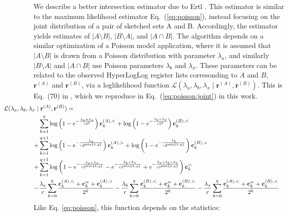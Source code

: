 \documentclass{report}
\begin{document}
We describe a better intersection estimator due to Ertl \cite{ertl2017new}.
This estimator is similar to the maximum likelihood estimator Eq.~(\ref{eq:poisson}), instead focusing on the joint distribution of a pair of sketched sets A and B.
Accordingly, the estimator yields estimates of $|A \setminus B|$, $|B \setminus A|$, and $|A \cap B|$. 
The algorithm depends on a similar optimization of a Poisson model application, where it is assumed that $|A \setminus B|$ is drawn from a Poisson distribution with parameter $\lambda_a$, and similarly $|B \setminus A|$ and $|A \cap B|$ use Poisson parameters $\lambda_b$ and $\lambda_x$. These parameters can be related to the observed HyperLogLog register lists corresonding to $A$ and $B$, $\mathbf{r}^{(A)}$ and $\mathbf{r}^{(B)}$, via a loglikelihood function $\mathcal{L}(\lambda_a, \lambda_b, \lambda_x \mid \mathbf{r}^{(A)}, \mathbf{r}^{(B)})$. 
This is Eq.~(70) in \cite{ertl2017new}, which we reproduce in Eq.~(\ref{eq:poisson:joint}) in this work. 
%
\begin{equation} \label{eq:poisson:joint}
	\begin{aligned}
		\mathclap{\mathcal{L}(\lambda_a, \lambda_b, \lambda_x \mid \mathbf{r}^{(A)}, \mathbf{r}^{(B)}) =} \\
		&\sum_{k=1}^q \log \left ( 1 - e^{-\frac{\lambda_a + \lambda_x}{r2^k}} \right ) \mathbf{c}^{(A), <}_k 
		+ \log \left ( 1 - e^{-\frac{\lambda_b + \lambda_x}{r2^k}} \right ) \mathbf{c}^{(B), <}_k\\
		+ &\sum_{k=1}^{q+1} \log \left ( 1 - e^{-\frac{\lambda_a}{r2^{\min\{k,q\}}}} \right ) \mathbf{c}^{(A), >}_k
		+ \log \left ( 1 - e^{-\frac{\lambda_b}{r2^{\min\{k,q\}}}} \right ) \mathbf{c}^{(B), >}_k \\
		+ &\sum_{k=1}^{q+1} \log \left ( 1 - e^{-\frac{\lambda_a + \lambda_x}{r2^{\min\{k,q\}}}} 
				- e^{-\frac{\lambda_b + \lambda_x}{r2^{\min\{k,q\}}}} + e^{-\frac{\lambda_a + \lambda_b + \lambda_x}{r2^{\min\{k,q\}}}} \right ) \mathbf{c}^{=}_k \\
		- &\frac{\lambda_a}{r} \sum_{k=0}^q \frac{\mathbf{c}^{(A),<}_k + \mathbf{c}^{=}_k + \mathbf{c}^{(A),>}_k}{2^k}
		- \frac{\lambda_b}{r} \sum_{k=0}^q \frac{\mathbf{c}^{(B),<}_k + \mathbf{c}^{=}_k + \mathbf{c}^{(B),>}_k}{2^k}
		- \frac{\lambda_x}{r} \sum_{k=0}^q \frac{\mathbf{c}^{(A),<}_k + \mathbf{c}^{=}_k + \mathbf{c}^{(B),<}_k}{2^k}
	\end{aligned}
\end{equation}
%
Like Eq. \eqref{eq:poisson}, this function depends on the statistics:
%
\end{document}
